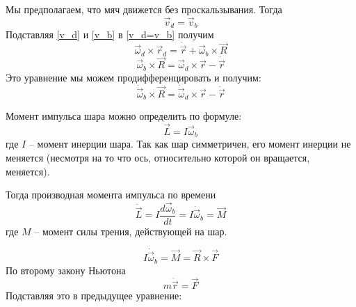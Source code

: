 \documentclass[a4paper,12pt]{article}
\begin{document}
	Мы предполагаем, что мяч движется без проскальзывания. Тогда
	\begin{equation}
		\label{v_d=v_b}
		\vec{v}_d=\vec{v}_b
	\end{equation}
	Подставляя \eqref{v_d} и \eqref{v_b} в \eqref{v_d=v_b} получим
	\[
	\vec{\omega}_d\times\vec{r}_d=\dot{\vec{r}}+\vec{\omega}_b\times\vec{R}
	\]
	\begin{equation}
		\label{beforediff}
		\vec{\omega}_b\times\vec{R}=\vec{\omega}_d\times\vec{r}-\dot{\vec{r}}
	\end{equation}
	Это уравнение мы можем продифференцировать и получим:
	\begin{equation}
		\label{afterdiff}
		\dot{\vec{\omega}}_b\times\vec{R}=\dot{\vec{\omega}}_d\times\vec{r}-\ddot{\vec{r}}
	\end{equation}
	
	Момент импульса шара можно определить по формуле:
	\[
	\vec{L}=I\vec{\omega}_b
	\]
	где $I$ -- момент инерции шара. Так как шар симметричен, его момент инерции не меняется (несмотря на то что ось, относительно которой он вращается, меняется).
	
	Тогда производная момента импульса по времени
	\begin{equation}
		\label{diffL}
		\dot{\vec{L}}=I\frac{d\vec{\omega}_b}{dt}=I\dot{\vec{\omega}}_b=\vec{M}
	\end{equation}
	где $M$ -- момент силы трения, действующей на шар.
	
	\begin{equation}
		I\dot{\vec{\omega}}_b=\vec{M}=\vec{R}\times\vec{F}
	\end{equation}
	По второму закону Ньютона
	\begin{equation}
		\label{2ndlawofmotion}
		m\ddot{\vec{r}}=\vec{F}
	\end{equation}
	Подставляя это в предыдущее уравнение:
	
\end{document}
